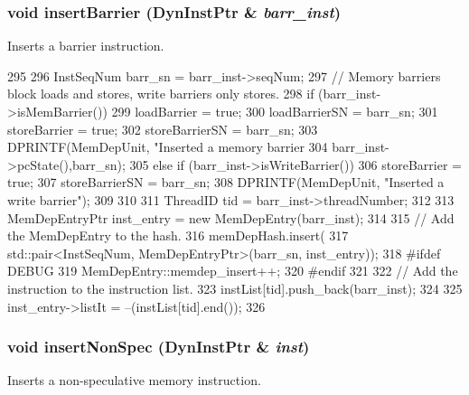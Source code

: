 \hypertarget{classMemDepUnit_ae556f19566bae9c4f55350eab17abacd}{
\subsubsection[{insertBarrier}]{\setlength{\rightskip}{0pt plus 5cm}void insertBarrier ({\bf DynInstPtr} \& {\em barr\_\-inst})}}
\label{classMemDepUnit_ae556f19566bae9c4f55350eab17abacd}
Inserts a barrier instruction. 


\begin{DoxyCode}
295 {
296     InstSeqNum barr_sn = barr_inst->seqNum;
297     // Memory barriers block loads and stores, write barriers only stores.
298     if (barr_inst->isMemBarrier()) {
299         loadBarrier = true;
300         loadBarrierSN = barr_sn;
301         storeBarrier = true;
302         storeBarrierSN = barr_sn;
303         DPRINTF(MemDepUnit, "Inserted a memory barrier %
304                 barr_inst->pcState(),barr_sn);
305     } else if (barr_inst->isWriteBarrier()) {
306         storeBarrier = true;
307         storeBarrierSN = barr_sn;
308         DPRINTF(MemDepUnit, "Inserted a write barrier\n");
309     }
310 
311     ThreadID tid = barr_inst->threadNumber;
312 
313     MemDepEntryPtr inst_entry = new MemDepEntry(barr_inst);
314 
315     // Add the MemDepEntry to the hash.
316     memDepHash.insert(
317         std::pair<InstSeqNum, MemDepEntryPtr>(barr_sn, inst_entry));
318 #ifdef DEBUG
319     MemDepEntry::memdep_insert++;
320 #endif
321 
322     // Add the instruction to the instruction list.
323     instList[tid].push_back(barr_inst);
324 
325     inst_entry->listIt = --(instList[tid].end());
326 }
\end{DoxyCode}
\hypertarget{classMemDepUnit_ad7036279ba36a8cfaf65554d1a5dbaac}{
\subsubsection[{insertNonSpec}]{\setlength{\rightskip}{0pt plus 5cm}void insertNonSpec ({\bf DynInstPtr} \& {\em inst})}}
\label{classMemDepUnit_ad7036279ba36a8cfaf65554d1a5dbaac}
Inserts a non-\/speculative memory instruction. 


